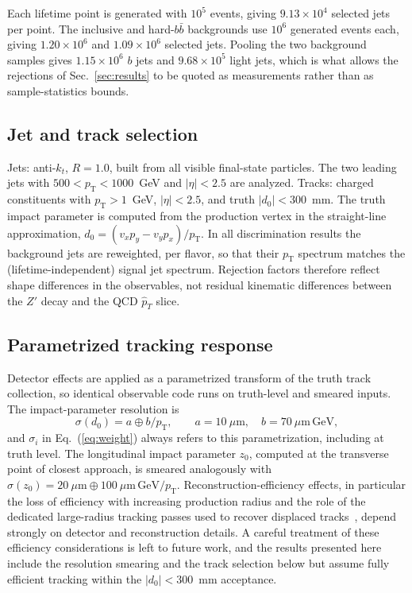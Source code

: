 \documentclass[a4paper,11pt]{article}
\newcommand{\dnought}{d_0}
\newcommand{\pT}{p_{\mathrm{T}}}
\begin{document}
Each lifetime point is generated with $10^5$ events, giving
$9.13\times 10^4$ selected jets per point. The inclusive and
hard-$b\bar b$ backgrounds use $10^6$ generated events each, giving
$1.20\times 10^6$ and $1.09\times 10^6$ selected jets. Pooling the
two background samples gives $1.15\times 10^6$ $b$ jets and
$9.68\times 10^5$ light jets, which is what allows the rejections of
Sec.~\ref{sec:results} to be quoted as measurements rather than
as sample-statistics bounds.

\subsection{Jet and track selection}

Jets: anti-$k_t$, $R=1.0$, built from all visible final-state
particles. The two leading jets with
$500 < \pT < 1000$~GeV and $|\eta| < 2.5$ are analyzed.
Tracks: charged constituents with $\pT > 1$~GeV, $|\eta| < 2.5$, and
truth $|\dnought| < 300$~mm. The truth impact parameter is computed
from the production vertex in the straight-line approximation,
$\dnought = (v_x p_y - v_y p_x)/\pT$. In all discrimination results the
background jets are reweighted, per flavor, so that their $\pT$
spectrum matches the (lifetime-independent) signal jet spectrum.
Rejection factors therefore reflect shape differences in the
observables, not residual kinematic differences between the $Z'$ decay
and the QCD $\hat p_T$ slice.

\subsection{Parametrized tracking response}
\label{sec:tracking}

Detector effects are applied as a parametrized transform of the truth
track collection, so identical observable code runs on truth-level and
smeared inputs. The impact-parameter resolution is
\begin{equation}
  \sigma(\dnought) = a \oplus b/\pT, \qquad
  a = 10~\mu\mathrm{m}, \quad b = 70~\mu\mathrm{m}\,\mathrm{GeV},
\end{equation}
and $\sigma_i$ in Eq.~(\ref{eq:weight}) always refers to this
parametrization, including at truth level. The longitudinal impact
parameter $z_0$, computed at the transverse point of closest approach,
is smeared analogously with
$\sigma(z_0) = 20~\mu\mathrm{m} \oplus 100~\mu\mathrm{m}\,\mathrm{GeV}/\pT$.
Reconstruction-efficiency effects, in particular the loss of efficiency
with increasing production radius and the role of the dedicated
large-radius tracking passes used to recover displaced
tracks~\cite{ATLAS:LRT}, depend strongly on detector and reconstruction
details. A careful treatment of these efficiency considerations is
left to future work, and the results presented here include the
resolution smearing and the track selection below but assume fully
efficient tracking within the $|\dnought| < 300$~mm acceptance.
\end{document}
